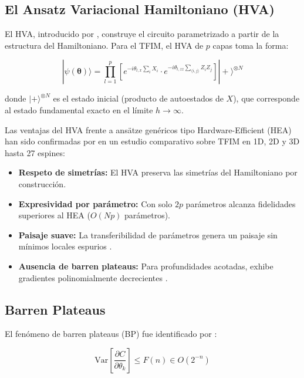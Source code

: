 \documentclass[11pt,a4paper,spanish]{book}
\begin{document}
\subsection{El Ansatz Variacional Hamiltoniano (HVA)}

El HVA, introducido por \citet{wiersema2020}, construye el circuito parametrizado a partir de la estructura del Hamiltoniano. Para el TFIM, el HVA de $p$ capas toma la forma:

\begin{equation}
|\psi(\boldsymbol{\theta})\rangle = \prod_{l=1}^{p} \left[ e^{-i\theta_{l,x} \sum_i X_i} \cdot e^{-i\theta_{l,zz} \sum_{\langle i,j \rangle} Z_i Z_j} \right] |+\rangle^{\otimes N}
\label{eq:hva}
\end{equation}

\noindent donde $|+\rangle^{\otimes N}$ es el estado inicial (producto de autoestados de $X$), que corresponde al estado fundamental exacto en el límite $h \to \infty$.

Las ventajas del HVA frente a ansätze genéricos tipo Hardware-Efficient (HEA) han sido confirmadas por \citet{tripathi2026} en un estudio comparativo sobre TFIM en 1D, 2D y 3D hasta 27 espines:

\begin{itemize}
    \item \textbf{Respeto de simetrías:} El HVA preserva las simetrías del Hamiltoniano por construcción.
    \item \textbf{Expresividad por parámetro:} Con solo $2p$ parámetros alcanza fidelidades superiores al HEA ($O(Np)$ parámetros).
    \item \textbf{Paisaje suave:} La transferibilidad de parámetros genera un paisaje sin mínimos locales espurios \citep{mele2022}.
    \item \textbf{Ausencia de barren plateaus:} Para profundidades acotadas, exhibe gradientes polinomialmente decrecientes \citep{wiersema2020}.
\end{itemize}

\subsection{Barren Plateaus}

El fenómeno de barren plateaus (BP) fue identificado por \citet{mcclean2018}:

\begin{equation}
\text{Var}\left[\frac{\partial C}{\partial \theta_k}\right] \leq F(n) \in O(2^{-n})
\label{eq:bp}
\end{equation}
\end{document}
